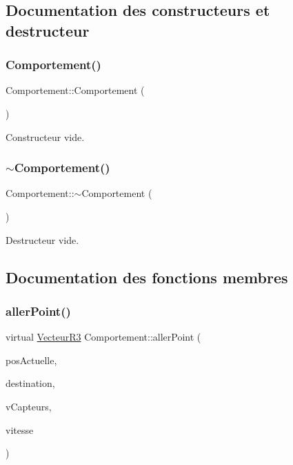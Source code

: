 \subsection{Documentation des constructeurs et destructeur}
\mbox{\label{class_comportement_a0c75007d7346cc14bb680eaa2981cb51}} 
\subsubsection{\texorpdfstring{Comportement()}{Comportement()}}
{\footnotesize\ttfamily Comportement\+::\+Comportement (\begin{DoxyParamCaption}{ }\end{DoxyParamCaption})}

Constructeur vide. \mbox{\label{class_comportement_acbe985635ed33cf141f380720c2e3f77}} 
\subsubsection{\texorpdfstring{$\sim$\+Comportement()}{~Comportement()}}
{\footnotesize\ttfamily Comportement\+::$\sim$\+Comportement (\begin{DoxyParamCaption}{ }\end{DoxyParamCaption})\hspace{0.3cm}{\ttfamily [virtual]}}

Destructeur vide. 

\subsection{Documentation des fonctions membres}
\mbox{\label{class_comportement_a38544976fc589cb8243c0c8071a692a6}} 
\subsubsection{\texorpdfstring{aller\+Point()}{allerPoint()}}
{\footnotesize\ttfamily virtual \mbox{\hyperlink{class_vecteur_r3}{Vecteur\+R3}} Comportement\+::aller\+Point (\begin{DoxyParamCaption}\item[{const \mbox{\hyperlink{class_vecteur_r3}{Vecteur\+R3}} \&}]{pos\+Actuelle,  }\item[{const \mbox{\hyperlink{class_vecteur_r3}{Vecteur\+R3}} \&}]{destination,  }\item[{const std\+::vector$<$ \mbox{\hyperlink{class_capteur}{Capteur}} $>$}]{v\+Capteurs,  }\item[{const \mbox{\hyperlink{class_vecteur_r3}{Vecteur\+R3}}}]{vitesse }\end{DoxyParamCaption})\hspace{0.3cm}{\ttfamily [pure virtual]}}

